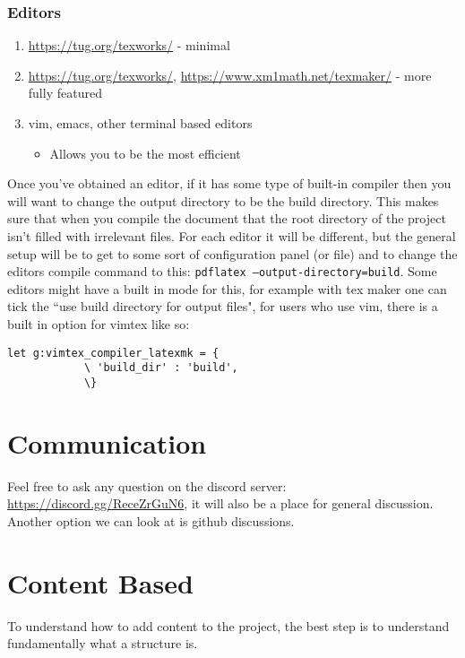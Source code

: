 \subsubsection*{Editors}
\begin{enumerate}
   \item \url{https://tug.org/texworks/} - minimal
   \item \url{https://tug.org/texworks/}, \url{https://www.xm1math.net/texmaker/} - more fully featured
    \item vim, emacs, other terminal based editors
    \begin{itemize}
        \item Allows you to be the most efficient
    \end{itemize}
\end{enumerate}

Once you've obtained an editor, if it has some type of built-in compiler then you will want to change the output directory to be the build directory. This makes sure that when you compile the document that the root directory of the project isn't filled with irrelevant files. For each editor it will be different, but the general setup will be to get to some sort of configuration panel (or file) and to change the editors compile command to this: \texttt{pdflatex --output-directory=build}. Some editors might have a built in mode for this, for example with tex maker one can tick the ``use build directory for output files", for users who use vim, there is a built in option for vimtex like so:

\begin{lstlisting}
let g:vimtex_compiler_latexmk = {
            \ 'build_dir' : 'build',
            \}
\end{lstlisting}

 
\section*{Communication}

Feel free to ask any question on the discord server: \url{https://discord.gg/ReceZrGuN6}, it will also be a place for general discussion. Another option we can look at is github discussions.

\section*{Content Based}

To understand how to add content to the project, the best step is to understand fundamentally what a structure is.

